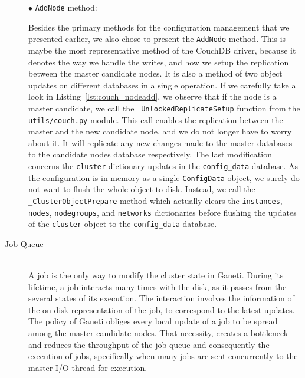 \begin{description}
    $\bullet$ {\Large{\texttt{AddNode} method:}}

    Besides the primary methods for the configuration management that
    we presented earlier, we also chose to present the \texttt{AddNode} method.
    This is maybe the most representative method of the CouchDB driver, because
    it denotes the way we handle the writes, and how we setup the replication
    between the master candidate nodes. It is also a method of two object
    updates on different databases in a single operation. If we carefully take a
    look in Listing~\ref{lst:couch_nodeadd}, we observe that if the node is a
    master candidate, we call the \texttt{\_UnlockedReplicateSetup} function
    from the \texttt{utils/couch.py} module. This call enables the replication
    between the master and the new candidate node, and we do not longer have to
    worry about it. It will replicate any new changes made to the master
    databases to the candidate nodes database respectively. The last
    modification concerns the \texttt{cluster} dictionary updates in the
    \texttt{config\_data} database. As the configuration is in memory as a
    single \texttt{ConfigData} object, we surely do not want to flush the whole
    object to disk. Instead, we call the \texttt{\_ClusterObjectPrepare} method
    which actually clears the \texttt{instances}, \texttt{nodes},
    \texttt{nodegroups}, and \texttt{networks} dictionaries before flushing the
    updates of the \texttt{cluster} object to the \texttt{config\_data}
    database.


  \item[Job Queue] \hfill \\
    A job is the only way to modify the cluster state in Ganeti. During its
    lifetime, a job interacts many times with the disk, as it passes from the
    several states of its execution. The interaction involves the
    information of the on-disk representation of the job, to correspond to the
    latest updates. The policy of Ganeti obliges every local update of a job to
    be spread among the master candidate nodes. That necessity, creates a
    bottleneck and reduces the throughput of the job queue and consequently the
    execution of jobs, specifically when many jobs are sent concurrently to the
    master I/O thread for execution.


\end{description}
